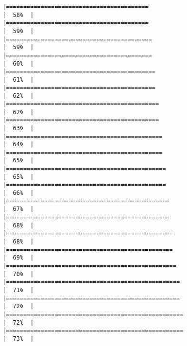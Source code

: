 \documentclass[
]{book}
\begin{document}
\begin{verbatim}
|=========================================                             |  58%  |                                                                              |=========================================                             |  59%  |                                                                              |==========================================                            |  59%  |                                                                              |==========================================                            |  60%  |                                                                              |===========================================                           |  61%  |                                                                              |===========================================                           |  62%  |                                                                              |============================================                          |  62%  |                                                                              |============================================                          |  63%  |                                                                              |=============================================                         |  64%  |                                                                              |=============================================                         |  65%  |                                                                              |==============================================                        |  65%  |                                                                              |==============================================                        |  66%  |                                                                              |===============================================                       |  67%  |                                                                              |===============================================                       |  68%  |                                                                              |================================================                      |  68%  |                                                                              |================================================                      |  69%  |                                                                              |=================================================                     |  70%  |                                                                              |==================================================                    |  71%  |                                                                              |==================================================                    |  72%  |                                                                              |===================================================                   |  72%  |                                                                              |===================================================                   |  73%  |                                                                              
\end{verbatim}
\end{document}

